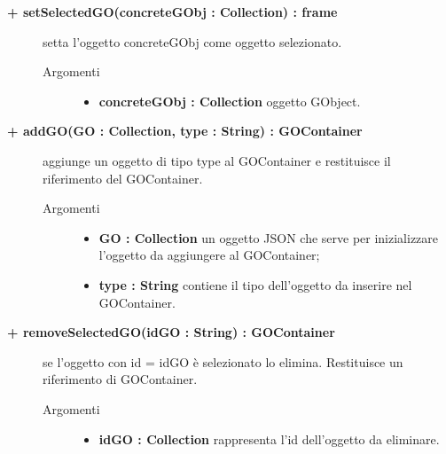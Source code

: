 \begin{description}
\begin{description}
		\item[\textbf{\color{blue}+ setSelectedGO(concreteGObj : Collection) : frame			}] \hfill
			setta l'oggetto concreteGObj come oggetto selezionato.  

\begin{description}
			\item[Argomenti] \hfill
				\begin{itemize}
						\item \textbf{concreteGObj : Collection			} \hfill
					oggetto GObject.
				\end{itemize}

\end{description}

\end{description}

\begin{description}
		\item[\textbf{\color{blue}+ addGO(GO : Collection, type : String) : GOContainer			}] \hfill
			aggiunge un oggetto di tipo type al GOContainer e restituisce il riferimento del GOContainer.  

\begin{description}
			\item[Argomenti] \hfill
				\begin{itemize}
						\item \textbf{GO : Collection			} \hfill
					un oggetto JSON che serve per inizializzare l'oggetto da aggiungere al GOContainer;
					  	\item \textbf{type : String			} \hfill
					  	contiene il tipo dell'oggetto da inserire nel GOContainer.
				\end{itemize}

\end{description}

\end{description}

\begin{description}
		\item[\textbf{\color{blue}+ removeSelectedGO(idGO : String) : GOContainer			}] \hfill
			se l'oggetto con id = idGO è selezionato lo elimina. Restituisce un riferimento di GOContainer. 

\begin{description}
			\item[Argomenti] \hfill
				\begin{itemize}
						\item \textbf{idGO : Collection			} \hfill
					rappresenta l'id dell'oggetto da eliminare.
				\end{itemize}


\end{description}
\end{description}
\end{description}
